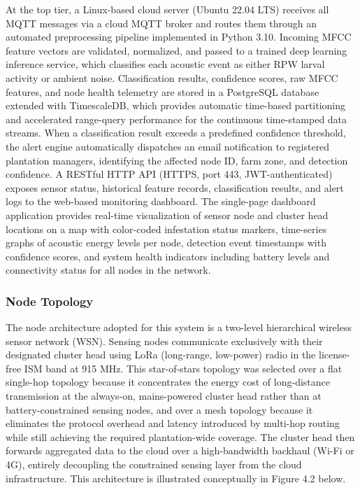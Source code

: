 \documentclass[12pt,a4paper,oneside]{memoir}
\begin{document}
At the top tier, a Linux-based cloud server (Ubuntu 22.04 LTS) receives all MQTT messages via a cloud MQTT broker and routes them through an automated preprocessing pipeline implemented in Python 3.10. Incoming MFCC feature vectors are validated, normalized, and passed to a trained deep learning inference service, which classifies each acoustic event as either RPW larval activity or ambient noise. Classification results, confidence scores, raw MFCC features, and node health telemetry are stored in a PostgreSQL database extended with TimescaleDB, which provides automatic time-based partitioning and accelerated range-query performance for the continuous time-stamped data streams. When a classification result exceeds a predefined confidence threshold, the alert engine automatically dispatches an email notification to registered plantation managers, identifying the affected node ID, farm zone, and detection confidence. A RESTful HTTP API (HTTPS, port 443, JWT-authenticated) exposes sensor status, historical feature records, classification results, and alert logs to the web-based monitoring dashboard. The single-page dashboard application provides real-time visualization of sensor node and cluster head locations on a map with color-coded infestation status markers, time-series graphs of acoustic energy levels per node, detection event timestamps with confidence scores, and system health indicators including battery levels and connectivity status for all nodes in the network.

\subsubsection{Node Topology}

The node architecture adopted for this system is a two-level hierarchical wireless sensor network (WSN). Sensing nodes communicate exclusively with their designated cluster head using LoRa (long-range, low-power) radio in the license-free ISM band at 915 MHz. This star-of-stars topology was selected over a flat single-hop topology because it concentrates the energy cost of long-distance transmission at the always-on, mains-powered cluster head rather than at battery-constrained sensing nodes, and over a mesh topology because it eliminates the protocol overhead and latency introduced by multi-hop routing while still achieving the required plantation-wide coverage. The cluster head then forwards aggregated data to the cloud over a high-bandwidth backhaul (Wi-Fi or 4G), entirely decoupling the constrained sensing layer from the cloud infrastructure. This architecture is illustrated conceptually in Figure 4.2 below.
\end{document}
